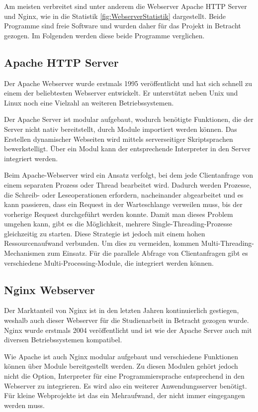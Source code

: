 Am meisten verbreitet sind unter anderem die Webserver Apache HTTP Server und Nginx, wie in die Statistik \ref{fig:WebserverStatistik} dargestellt. Beide Programme sind freie Software und wurden daher für das Projekt in Betracht gezogen. Im Folgenden werden diese beide Programme verglichen.


\subsection{Apache HTTP Server}
Der Apache Webserver wurde erstmals 1995 veröffentlicht und hat sich schnell zu einem der beliebtesten Webserver entwickelt. Er unterstützt neben Unix und Linux noch eine Vielzahl an weiteren Betriebssystemen.

Der Apache Server ist modular aufgebaut, wodurch benötigte Funktionen, die der Server nicht nativ bereitstellt, durch Module importiert werden können. Das Erstellen dynamischer Webseiten wird mittels serverseitiger Skriptsprachen bewerkstelligt. Über ein Modul kann der entsprechende Interpreter in den Server integriert werden.

Beim Apache-Webserver wird ein Ansatz verfolgt, bei dem jede Clientanfrage von einem separaten Prozess oder Thread bearbeitet wird. Dadurch werden Prozesse, die Schreib- oder Leseoperationen erfordern, nacheinander abgearbeitet und es kann passieren, dass ein Request in der Warteschlange verweilen muss, bis der vorherige Request durchgeführt werden konnte. Damit man dieses Problem umgehen kann, gibt es die Möglichkeit, mehrere Single-Threading-Prozesse gleichzeitig zu starten. Diese Strategie ist jedoch mit einem hohen Ressourcenaufwand verbunden. Um dies zu vermeiden, kommen Multi-Threading-Mechanismen zum Einsatz. Für die parallele Abfrage von Clientanfragen gibt es verschiedene Multi-Processing-Module, die integriert werden können.



\subsection{Nginx Webserver}
Der Marktanteil von Nginx ist in den letzten Jahren kontinuierlich gestiegen, weshalb auch dieser Webserver für die Studienarbeit in Betracht gezogen wurde. Nginx wurde erstmals 2004 veröffentlicht und ist wie der Apache Server auch mit diversen Betriebssystemen kompatibel.

Wie Apache ist auch Nginx modular aufgebaut und verschiedene Funktionen können über Module bereitgestellt werden. Zu diesen Modulen gehört jedoch nicht die Option, Interpreter für eine Programmiersprache entsprechend in den Webserver zu integrieren. Es wird also ein weiterer Anwendungsserver benötigt. Für kleine Webprojekte ist das ein Mehraufwand, der nicht immer eingegangen werden muss. 

